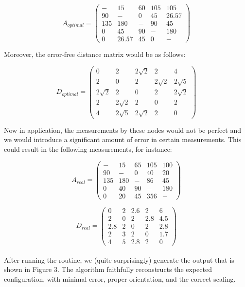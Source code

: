 \documentclass[12pt]{article}
\begin{document}
\[ A_{optimal}= \left( \begin{array}{ccccc}
- & 15 & 60 & 105 & 105 \\
90 & - & 0 & 45 & 26.57 \\
135 & 180 & - & 90 & 45 \\
0 & 45 & 90 & - & 180 \\
0 & 26.57 & 45 & 0 & - \end{array} \right)\] 

Moreover, the error-free distance matrix would be as follows:

 \[ D_{optimal}  =\left( \begin{array}{ccccc}
0 & 2 & 2\sqrt{2} & 2 & 4 \\
2 & 0 & 2 & 2\sqrt{2} & 2\sqrt{5} \\
2\sqrt{2} & 2 & 0 & 2 & 2\sqrt{2} \\
2 & 2\sqrt{2} & 2 & 0 & 2 \\
4 & 2\sqrt{5} & 2\sqrt{2} & 2 & 0 \end{array} \right)\] 

Now in application, the measurements by these nodes would not be perfect and we would introduce a significant amount of error in certain measurements. This could result in the following measurements, for instance:

\[ A_{real}= \left( \begin{array}{ccccc}
- & 15 & 65 & 105 & 100 \\
90 & - & 0 & 40 & 20 \\
135 & 180 & - & 86 & 45 \\
0 & 40 & 90 & - & 180 \\
0 & 20 & 45 & 356 & - \end{array} \right)\] 

 \[ D_{real}  =\left( \begin{array}{ccccc}
0 & 2 & 2.6 & 2 & 6 \\
2 & 0 & 2 & 2.8 & 4.5 \\
2.8 & 2 & 0 & 2 & 2.8 \\
2 & 3 & 2 & 0 & 1.7 \\
4 & 5 & 2.8 & 2 & 0 \end{array} \right)\] 

\paragraph{}
After running the routine, we (quite surprisingly) generate the output that is shown in Figure 3. The algorithm faithfully reconstructs the expected configuration, with minimal error, proper orientation, and the correct scaling. 
\end{document}
